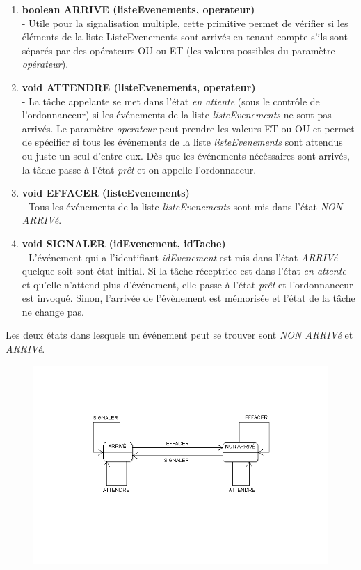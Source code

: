 {
\begin{enumerate}
   \item \textbf{boolean ARRIVE (listeEvenements, operateur)}
	~\\ - Utile pour la signalisation multiple, cette primitive permet de
	vérifier si les éléments de la liste ListeEvenements sont arrivés en tenant
	compte s'ils sont séparés par des opérateurs OU ou ET (les valeurs possibles
	du paramètre \textit{opérateur}).
   \item \textbf{void ATTENDRE (listeEvenements, operateur)}
	~\\ - La tâche appelante se met dans l'état \textit{en attente}
	 (sous le contrôle de l'ordonnanceur) si les événements de la liste
	 \textit{listeEvenements} ne sont pas arrivés. 
	 Le paramètre \textit{operateur} peut prendre les valeurs ET ou OU et 
	 permet de spécifier si tous les événements de la liste
	 \textit{listeEvenements} sont attendus ou juste un seul d'entre eux. 
	 Dès que les événements nécéssaires sont arrivés, la tâche passe à l'état
	 \textit{prêt} et on appelle l'ordonnaceur.
   \item \textbf{void EFFACER (listeEvenements)}
	~\\ - Tous les événements de la liste \textit{listeEvenements} sont
		mis dans l'état \textit{NON ARRIVé}.
	\item \textbf{void SIGNALER (idEvenement, idTache)}
	~\\ - L'événement qui a l'identifiant \textit{idEvenement} est mis dans l'état
	\textit{ARRIVé} quelque soit sont état initial. 
	Si la tâche réceptrice est dans l'état \textit{en attente} et qu'elle n'attend
	plus d'événement, elle passe à l'état \textit{prêt} et l'ordonnanceur est invoqué. 
	Sinon, l'arrivée de l'évènement est mémorisée et l'état de la tâche ne change pas.
\end{enumerate}
}
{
Les deux états dans lesquels un événement peut se trouver sont \textit{NON
ARRIVé} et \textit{ARRIVé}.

\begin{figure} [htp]
\centering
\includegraphics[width=\textwidth]{img/EtatsEvenement.png}
\end{figure}
}
